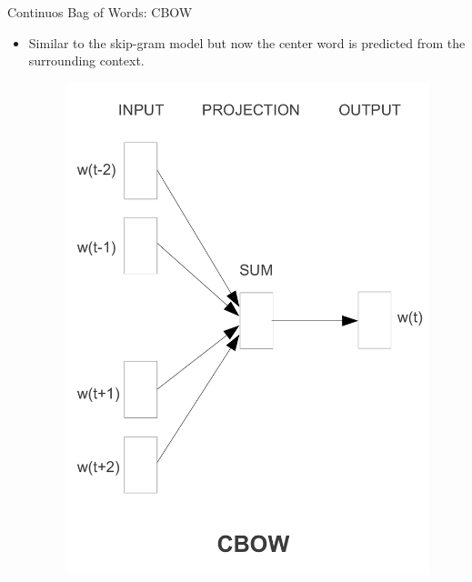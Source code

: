 \begin{frame}{Continuos Bag of Words: CBOW}
\begin{scriptsize}
\begin{itemize}
\item  Similar to the skip-gram model but now the center word is predicted from the surrounding context.
 \begin{figure}[h]
    	\includegraphics[scale = 0.55]{pics/CBOW.png}
    \end{figure}
       
        
\end{itemize}
\end{scriptsize}
\end{frame}




